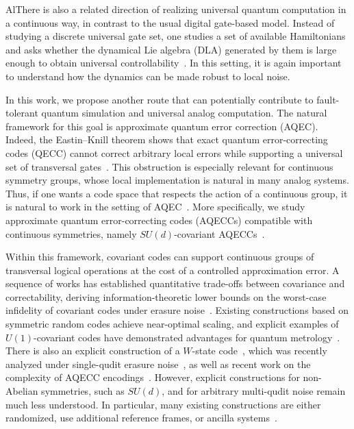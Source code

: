 \documentclass[10pt,twocolumn,superscriptaddress,aps,amsmath,amssymb,citeautoscript,floatfix,prx,longbibliography]{revtex4-2}
\newcounter{alg}
\theoremstyle{plain}
\theoremstyle{plain}
\theoremstyle{plain}
\theoremstyle{plain}
\theoremstyle{plain}
\theoremstyle{plain}
\begin{document}
AlThere is also a related direction of realizing universal quantum computation in a continuous way, in contrast to the usual digital gate-based model. Instead of studying a discrete universal gate set, one studies a set of available Hamiltonians and asks whether the dynamical Lie algebra (DLA) generated by them is large enough to obtain universal controllability~\cite{Tavis1968,DAlessandro2021,Chen2020,Albertini2018,Albertini2020,Wang2016,Wang2012,Zanardi2004,AlbertiniDAlessandro2025,Hu2025}. In this setting, it is again important to understand how the dynamics can be made robust to local noise.

In this work, we propose another route that can potentially contribute to fault-tolerant quantum simulation and universal analog computation. The natural framework for this goal is approximate quantum error correction (AQEC). Indeed, the Eastin--Knill theorem shows that exact quantum error-correcting codes (QECC) cannot correct arbitrary local errors while supporting a universal set of transversal gates~\cite{Eastin2009}. This obstruction is especially relevant for continuous symmetry groups, whose local implementation is natural in many analog systems. Thus, if one wants a code space that respects the action of a continuous group, it is natural to work in the setting of AQEC~\cite{Beny2010}. More specifically, we study approximate quantum error-correcting codes (AQECCs) compatible with continuous symmetries, namely \(SU(d)\)-covariant AQECCs~\cite{Hayden2021}.

Within this framework, covariant codes can support continuous groups of transversal logical operations at the cost of a controlled approximation error. A sequence of works has established quantitative trade-offs between covariance and correctability, deriving information-theoretic lower bounds on the worst-case infidelity of covariant codes under erasure noise~\cite{Faist2020,Zhou2021,Faist2023,Kong2022,Yang2022}. Existing constructions based on symmetric random codes achieve near-optimal scaling, and explicit examples of \(U(1)\)-covariant codes have demonstrated advantages for quantum metrology~\cite{Lin2025}. There is also an explicit construction of a \(W\)-state code~\cite{Faist2020}, which was recently analyzed under single-qudit erasure noise~\cite{Alexander2025}, as well as recent work on the complexity of AQECC encodings~\cite{Yi2024}. However, explicit constructions for non-Abelian symmetries, such as \(SU(d)\), and for arbitrary multi-qudit noise remain much less understood. In particular, many existing constructions are either randomized, use additional reference frames, or ancilla systems~\cite{Kong2022,Yang2022}.
\end{document}
